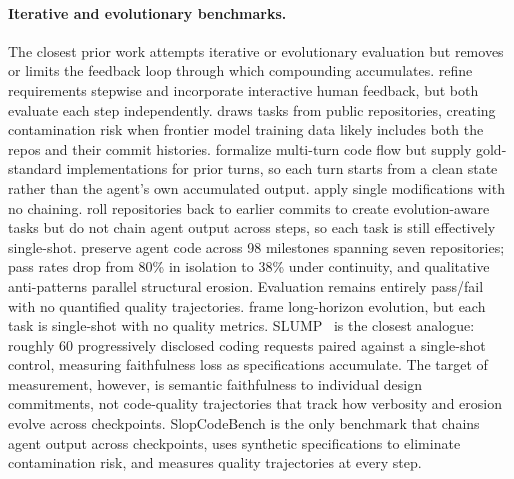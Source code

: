 \paragraph{Iterative and evolutionary benchmarks.} The closest prior work attempts iterative or evolutionary evaluation but removes or limits the feedback loop through which compounding accumulates. \citet{sr-eval} refine requirements stepwise and \citet{recode-h} incorporate interactive human feedback, but both evaluate each step independently. \citet{swe-ci} draws tasks from public repositories, creating contamination risk when frontier model training data likely includes both the repos and their commit histories. \citet{codeflowbench} formalize multi-turn code flow but supply gold-standard implementations for prior turns, so each turn starts from a clean state rather than the agent's own accumulated output. \citet{maintaincoder} apply single modifications with no chaining. \citet{humanevo} roll repositories back to earlier commits to create evolution-aware tasks but do not chain agent output across steps, so each task is still effectively single-shot. \citet{evoclaw} preserve agent code across 98 milestones spanning seven repositories; pass rates drop from 80\% in isolation to 38\% under continuity, and qualitative anti-patterns parallel structural erosion. Evaluation remains entirely pass/fail with no quantified quality trajectories. \citet{thai2025-swe-evo} frame long-horizon evolution, but each task is single-shot with no quality metrics. SLUMP~\citep{slump} is the closest analogue: roughly 60 progressively disclosed coding requests paired against a single-shot control, measuring faithfulness loss as specifications accumulate. The target of measurement, however, is semantic faithfulness to individual design commitments, not code-quality trajectories that track how verbosity and erosion evolve across checkpoints. SlopCodeBench is the only benchmark that chains agent output across checkpoints, uses synthetic specifications to eliminate contamination risk, and measures quality trajectories at every step.


